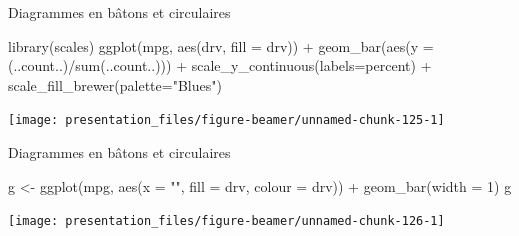 \documentclass[12pt,handout,ignorenonframetext,]{beamer}
\newenvironment{Shaded}{}{}
\newcommand{\KeywordTok}[1]{\textcolor[rgb]{0.00,0.00,1.00}{#1}}
\newcommand{\DataTypeTok}[1]{#1}
\newcommand{\DecValTok}[1]{#1}
\newcommand{\StringTok}[1]{\textcolor[rgb]{0.00,0.50,0.50}{#1}}
\newcommand{\OperatorTok}[1]{#1}
\newcommand{\NormalTok}[1]{#1}
\renewenvironment{Shaded}{\begin{snugshade}}{\end{snugshade}}
\begin{document}
\begin{frame}[fragile]{Diagrammes en bâtons et circulaires}

\footnotesize \center

\begin{Shaded}
\begin{Highlighting}[]
\KeywordTok{library}\NormalTok{(scales)}
\KeywordTok{ggplot}\NormalTok{(mpg, }\KeywordTok{aes}\NormalTok{(drv, }\DataTypeTok{fill =}\NormalTok{ drv)) }\OperatorTok{+}\StringTok{ }
\StringTok{  }\KeywordTok{geom_bar}\NormalTok{(}\KeywordTok{aes}\NormalTok{(}\DataTypeTok{y =}\NormalTok{ (..count..)}\OperatorTok{/}\KeywordTok{sum}\NormalTok{(..count..))) }\OperatorTok{+}
\StringTok{  }\KeywordTok{scale_y_continuous}\NormalTok{(}\DataTypeTok{labels=}\NormalTok{percent) }\OperatorTok{+}
\StringTok{  }\KeywordTok{scale_fill_brewer}\NormalTok{(}\DataTypeTok{palette=}\StringTok{"Blues"}\NormalTok{)}
\end{Highlighting}
\end{Shaded}

\texttt{[image: presentation\_files/figure-beamer/unnamed-chunk-125-1]}

\end{frame}

\begin{frame}[fragile]{Diagrammes en bâtons et circulaires}

\footnotesize \center

\begin{Shaded}
\begin{Highlighting}[]
\NormalTok{g <-}\StringTok{ }\KeywordTok{ggplot}\NormalTok{(mpg, }\KeywordTok{aes}\NormalTok{(}\DataTypeTok{x =} \StringTok{""}\NormalTok{, }\DataTypeTok{fill =}\NormalTok{ drv, }\DataTypeTok{colour =}\NormalTok{ drv)) }\OperatorTok{+}\StringTok{ }
\StringTok{  }\KeywordTok{geom_bar}\NormalTok{(}\DataTypeTok{width =} \DecValTok{1}\NormalTok{)}
\NormalTok{g}
\end{Highlighting}
\end{Shaded}

\texttt{[image: presentation\_files/figure-beamer/unnamed-chunk-126-1]}

\end{frame}
\end{document}

